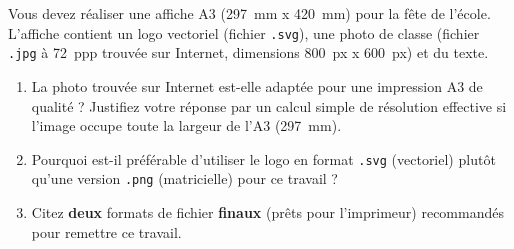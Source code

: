 \documentclass[11pt]{article}
\begin{document}
\begin{exercice}
Vous devez réaliser une affiche A3 (\SI{297}{mm} x \SI{420}{mm}) pour la fête de l'école. L'affiche contient un logo vectoriel (fichier \texttt{.svg}), une photo de classe (fichier \texttt{.jpg} à \SI{72}{ppp} trouvée sur Internet, dimensions \SI{800}{px} x \SI{600}{px}) et du texte.
\begin{enumerate}
    \item La photo trouvée sur Internet est-elle adaptée pour une impression A3 de qualité ? Justifiez votre réponse par un calcul simple de résolution effective si l'image occupe toute la largeur de l'A3 (\SI{297}{mm}).
    \item Pourquoi est-il préférable d'utiliser le logo en format \texttt{.svg} (vectoriel) plutôt qu'une version \texttt{.png} (matricielle) pour ce travail ?
    \item Citez \textbf{deux} formats de fichier \textbf{finaux} (prêts pour l'imprimeur) recommandés pour remettre ce travail.
\end{enumerate}
\end{exercice}
\end{document}

